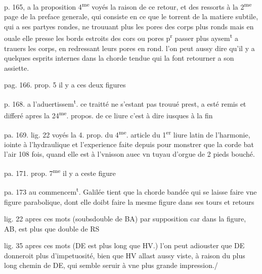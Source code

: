 \documentclass[11pt,a4paper]{article}
\begin{document}
p. 165, a la proposition 4\textsuperscript{me}
voyés la raison de ce retour, et des ressorts à la 2\textsuperscript{me} page de la preface generale, qui consiste en ce que le torrent de la matiere subtile, qui a ses partyes rondes, ne trouuant plus les pores des corps plus ronds mais en ouale elle  presse les bords estroits des cors ou pores p\textsuperscript{r} passer plus aysem\textsuperscript{t} a trauers les corps, en redressant leurs pores en rond. l'on peut aussy dire qu'il y a quelques esprits internes dans la chorde tendue qui la font retourner a son assiette.

 pag. 166. prop. 5 il y a ces deux figures

p. 168. a l'aduertissem\textsuperscript{t}.
ce traitté ne s'estant pas trouué prest, a esté remis et differé apres la 24\textsuperscript{me}. propos. de ce liure c'est à dire iusques à la fin

pa. 169. lig. 22
voyés la 4. prop. du 4\textsuperscript{me}. article du 1\textsuperscript{er} liure latin de l'harmonie, iointe à l'hydraulique et l'experience faite depuis pour monstrer que la corde bat l'air 108 fois, quand elle est à l'vnisson auec vn tuyau d'orgue de 2 pieds bouché.

pa. 171. prop. 7\textsuperscript{me} il y a ceste figure

pa. 173 au commencem\textsuperscript{t}.
Galilée tient que la chorde bandée qui se laisse faire vne figure parabolique, dont elle doibt faire la mesme figure dans ses tours et retours

lig. 22 apres ces mots (soubsdouble de BA)
par supposition car dans la figure, AB, est plus  que double de RS

lig. 35 apres ces mots (DE est plus long que HV.)
l'on peut adiouster que DE donneroit plus d'impetuosité, bien que HV allast aussy viste, à raison du plus long chemin de DE, qui semble seruir à vne plus grande impression./
\end{document}
